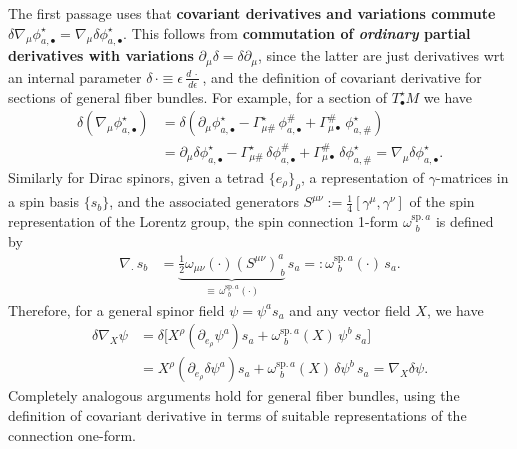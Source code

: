 \begin{mytheorem}
The first passage uses that \textbf{covariant derivatives and variations commute} { $\delta \nabla_\mu \phi^\star_{a,\bullet} = \nabla_\mu \delta \phi^\star_{a,\bullet}$.}
This follows from \textbf{commutation of \emph{ordinary} partial derivatives with variations} $\partial_\mu \delta=\delta\partial_\mu$, since the latter are just derivatives wrt an internal parameter $\delta\,\cdot \equiv \epsilon\, \frac{d\,\cdot}{d\epsilon}\,$, and the definition of covariant derivative for sections of general fiber bundles.
For example, for a section of $T^\star_\bullet M$ we have
\begin{align}
    \delta (\nabla_\mu \phi^\star_{a,\bullet})
    &= \delta \left( \partial_\mu \phi^\star_{a,\bullet} -\Gamma_{\mu \#}^\star \,\phi^{\#}_{a,\bullet} + \Gamma_{\mu\bullet}^{\#}\,\phi^\star_{a,\#}\right)
    \\
    &= \partial_\mu \delta \phi^\star_{a,\bullet} - \Gamma_{\mu \#}^\star \,\delta \phi^{\#}_{a,\bullet} + \Gamma_{\mu\bullet}^{\#}\,\delta \phi^\star_{a,\#}
    = \nabla_\mu \delta \phi^\star_{a,\bullet}.
\end{align}
%
Similarly for Dirac spinors, given a tetrad $\{e_\rho\}_\rho$, a representation of $\gamma$-matrices in a spin basis $\{s_b\}$, and the associated generators $S^{\mu\nu}:=\frac{1}{4}[\gamma^\mu,\gamma^\nu]$ of the spin representation of the Lorentz group, the spin connection 1-form $\omega^{\mathrm{sp.\,}a}_{\,~b}$ is defined by
\begin{align}
    \nabla_{\cdot}\, s_b &=  \underbrace{\tfrac{1}{2}\omega_{\mu\nu}(\cdot) \left(S^{\mu\nu}\right)^a_{~b}}_{\equiv \,\omega^{\mathrm{sp.\,}a}_{\,~b}(\cdot)}\,  s_a =: \omega^{\mathrm{sp.\,}a}_{\,~b}(\cdot)\, s_a.
\end{align}
Therefore, for a general spinor field $\psi=\psi^a s_a$ and any vector field $X$, we have
\begin{align}
    \delta \nabla_{X} \psi 
    &= \delta \Big[ X^\rho \left(\partial_{e_\rho} \psi^a\right) s_a + \omega^{\mathrm{sp.\,}a}_{\,~b}(X)\, \psi^b\, s_a\Big]
    \\
    &= X^\rho \left(\partial_{e_\rho} \delta \psi^a\right) s_a + \omega^{\mathrm{sp.\,}a}_{\,~b}(X)\, \delta \psi^b\, s_a
    = \nabla_X \delta \psi.
\end{align}
%
Completely analogous arguments hold for general fiber bundles, using the definition of covariant derivative in terms of suitable representations of the connection one-form.
 


\end{mytheorem}
